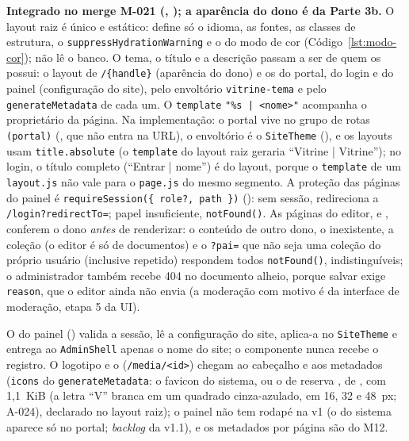 \textbf{Integrado no merge M-021 (, ); a aparência do dono é da Parte 3b.} O layout raiz é único e estático: define só o idioma, as fontes, as classes de estrutura, o \texttt{suppressHydrationWarning} e o  do modo de cor (Código~\ref{lst:modo-cor}); não lê o banco. O tema, o título e a descrição passam a ser de quem os possui: o layout de \texttt{/\{handle\}} (aparência do dono) e os do portal, do login e do painel (configuração do site), pelo envoltório \texttt{vitrine-tema} e pelo \texttt{generateMetadata} de cada um. O \texttt{template} \texttt{"\%s | <nome>"} acompanha o proprietário da página. Na implementação: o portal vive no grupo de rotas \texttt{(portal)} (, que não entra na URL), o envoltório é o \texttt{SiteTheme} (), e os layouts usam \texttt{title.absolute} (o \texttt{template} do layout raiz geraria ``Vitrine | Vitrine''); no login, o título completo (``Entrar | nome'') é do layout, porque o \texttt{template} de um \texttt{layout.js} não vale para o \texttt{page.js} do mesmo segmento. A proteção das páginas do painel é \texttt{requireSession(\{ role?, path \})} (): sem sessão, redireciona a \texttt{/login?redirectTo=}; papel insuficiente, \texttt{notFound()}. As páginas do editor,  e , conferem o dono \emph{antes} de renderizar: o conteúdo de outro dono, o inexistente, a coleção (o editor é só de documentos) e o \texttt{?pai=} que não seja uma coleção do próprio usuário (inclusive repetido) respondem todos \texttt{notFound()}, indistinguíveis; o administrador também recebe 404 no documento alheio, porque salvar exige \texttt{reason}, que o editor ainda não envia (a moderação com motivo é da interface de moderação, etapa 5 da UI).

O  do painel () valida a sessão, lê a configuração do site, aplica-a no \texttt{SiteTheme} e entrega ao \texttt{AdminShell} apenas o nome do site; o componente nunca recebe o registro. O logotipo e o  (\texttt{/media/<id>}) chegam ao cabeçalho e aos metadados (\texttt{icons} do \texttt{generateMetadata}: o favicon do sistema, ou o de reserva , de , com 1,1~KiB (a letra ``V'' branca em um quadrado cinza-azulado, em 16, 32 e 48~px; A-024), declarado no layout raiz); o painel não tem rodapé na v1 (o do sistema aparece só no portal; \emph{backlog} da v1.1), e os metadados por página são do M12.

